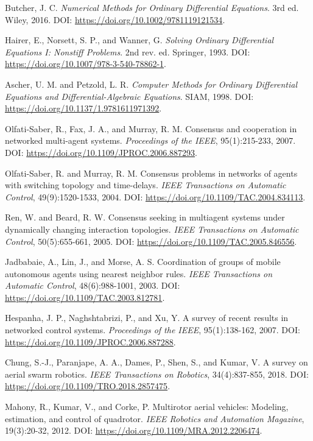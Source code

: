 \documentclass[UTF8,zihao=-4]{ctexart}
\begin{document}
\begin{enumerate}[label={[\arabic*]},leftmargin=2.6em,itemsep=0.2em]
  \item Butcher, J. C. \textit{Numerical Methods for Ordinary Differential Equations}. 3rd ed. Wiley, 2016. DOI: \url{https://doi.org/10.1002/9781119121534}.
  \item Hairer, E., Norsett, S. P., and Wanner, G. \textit{Solving Ordinary Differential Equations I: Nonstiff Problems}. 2nd rev. ed. Springer, 1993. DOI: \url{https://doi.org/10.1007/978-3-540-78862-1}.
  \item Ascher, U. M. and Petzold, L. R. \textit{Computer Methods for Ordinary Differential Equations and Differential-Algebraic Equations}. SIAM, 1998. DOI: \url{https://doi.org/10.1137/1.9781611971392}.
  \item Olfati-Saber, R., Fax, J. A., and Murray, R. M. Consensus and cooperation in networked multi-agent systems. \textit{Proceedings of the IEEE}, 95(1):215-233, 2007. DOI: \url{https://doi.org/10.1109/JPROC.2006.887293}.
  \item Olfati-Saber, R. and Murray, R. M. Consensus problems in networks of agents with switching topology and time-delays. \textit{IEEE Transactions on Automatic Control}, 49(9):1520-1533, 2004. DOI: \url{https://doi.org/10.1109/TAC.2004.834113}.
  \item Ren, W. and Beard, R. W. Consensus seeking in multiagent systems under dynamically changing interaction topologies. \textit{IEEE Transactions on Automatic Control}, 50(5):655-661, 2005. DOI: \url{https://doi.org/10.1109/TAC.2005.846556}.
  \item Jadbabaie, A., Lin, J., and Morse, A. S. Coordination of groups of mobile autonomous agents using nearest neighbor rules. \textit{IEEE Transactions on Automatic Control}, 48(6):988-1001, 2003. DOI: \url{https://doi.org/10.1109/TAC.2003.812781}.
  \item Hespanha, J. P., Naghshtabrizi, P., and Xu, Y. A survey of recent results in networked control systems. \textit{Proceedings of the IEEE}, 95(1):138-162, 2007. DOI: \url{https://doi.org/10.1109/JPROC.2006.887288}.
  \item Chung, S.-J., Paranjape, A. A., Dames, P., Shen, S., and Kumar, V. A survey on aerial swarm robotics. \textit{IEEE Transactions on Robotics}, 34(4):837-855, 2018. DOI: \url{https://doi.org/10.1109/TRO.2018.2857475}.
  \item Mahony, R., Kumar, V., and Corke, P. Multirotor aerial vehicles: Modeling, estimation, and control of quadrotor. \textit{IEEE Robotics and Automation Magazine}, 19(3):20-32, 2012. DOI: \url{https://doi.org/10.1109/MRA.2012.2206474}.

\end{enumerate}
\end{document}
